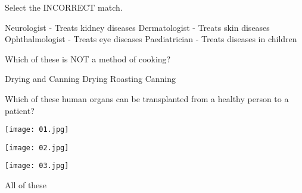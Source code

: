 


\begin{center}
\end{center}

\begin{questions}
    \question Select the INCORRECT match.

    \begin{randomizechoices}
        \CorrectChoice Neurologist - Treats kidney diseases
        \choice Dermatologist - Treats skin diseases
        \choice Ophthalmologist - Treats eye diseases
        \choice Paediatrician - Treats diseases in children
    \end{randomizechoices}

    \question Which of these is NOT a method of cooking?

    \begin{randomizeoneparchoices}
        \CorrectChoice Drying and Canning
        \choice Drying
        \choice Roasting
        \choice Canning
    \end{randomizeoneparchoices}

    \question Which of these human organs can be transplanted from a healthy person to a patient?

    \begin{choices}
        \begin{minipage}[t]{0.45\textwidth}
            \CorrectChoice
            \texttt{[image: 01.jpg]}
        \end{minipage}
        \begin{minipage}[t]{0.45\textwidth}
            \choice
            \texttt{[image: 02.jpg]}
        \end{minipage}
        \vspace{0.5em} %
        \begin{minipage}[t]{0.45\textwidth}
            \choice
            \texttt{[image: 03.jpg]}
        \end{minipage}
        \begin{minipage}[t]{0.45\textwidth}
            \choice All of these
        \end{minipage}
    \end{choices}


\end{questions}
